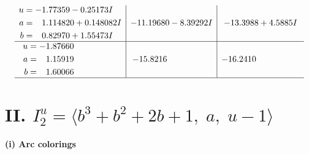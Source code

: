 \documentclass[1p]{elsarticle_modified}
\theoremstyle{definition}
\begin{document}
$$\begin{array}{c|c|c}
\begin{aligned}
u &= -1.77359 - 0.25173 I \\
a &= \phantom{-}1.114820 + 0.148082 I \\
b &= \phantom{-}0.82970 + 1.55473 I\end{aligned}
 & -11.19680 - 8.39292 I & -13.3988 + 4.5885 I \\ \hline\begin{aligned}
u &= -1.87660\phantom{ +0.000000I} \\
a &= \phantom{-}1.15919\phantom{ +0.000000I} \\
b &= \phantom{-}1.60066\phantom{ +0.000000I}\end{aligned}
 & -15.8216\phantom{ +0.000000I} & -16.2410\phantom{ +0.000000I}\\
 \hline 
 \end{array}$$\newpage\newpage\renewcommand{\arraystretch}{1}
\centering \section*{II. $I^u_{2}= \langle b^3+b^2+2 b+1,\;a,\;u-1 \rangle$}
\flushleft \textbf{(i) Arc colorings}\\
\end{document}
